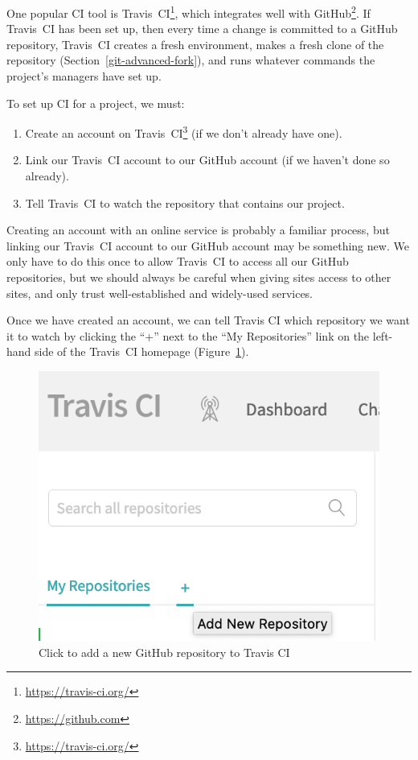 \documentclass[
]{krantz}
\providecommand{\tightlist}{%
  \setlength{\itemsep}{0pt}\setlength{\parskip}{0pt}}
\renewcommand{\href}[2]{#2\footnote{\url{#1}}}
\begin{document}
One popular CI tool is \href{https://travis-ci.org/}{Travis~CI},
which integrates well with
\href{https://github.com}{GitHub}.
If Travis~CI has been set up,
then every time a change is committed to a GitHub repository,
Travis~CI creates a fresh environment,
makes a fresh clone of the repository (Section~\ref{git-advanced-fork}),
and runs whatever commands the project's managers have set up.

To set up CI for a project, we must:

\begin{enumerate}
\def\labelenumi{\arabic{enumi}.}
\tightlist
\item
  Create an account on \href{https://travis-ci.org/}{Travis~CI} (if we don't already have one).
\item
  Link our Travis~CI account to our GitHub account (if we haven't done so already).
\item
  Tell Travis~CI to watch the repository that contains our project.
\end{enumerate}

Creating an account with an online service is probably a familiar process,
but linking our Travis~CI account to our GitHub account may be something new.
We only have to do this once
to allow Travis~CI to access all our GitHub repositories,
but we should always be careful when giving sites access to other sites,
and only trust well-established and widely-used services.

Once we have created an account,
we can tell Travis CI which repository we want it to watch
by clicking the ``+'' next to the ``My Repositories'' link
on the left-hand side of the Travis~CI homepage (Figure~\ref{fig:testing-add-repo}).

\begin{figure}

{\centering \includegraphics[width=0.5\linewidth]{figures/testing/travis-add-repo} 

}

\caption{Click to add a new GitHub repository to Travis CI}\label{fig:testing-add-repo}
\end{figure}
\end{document}
